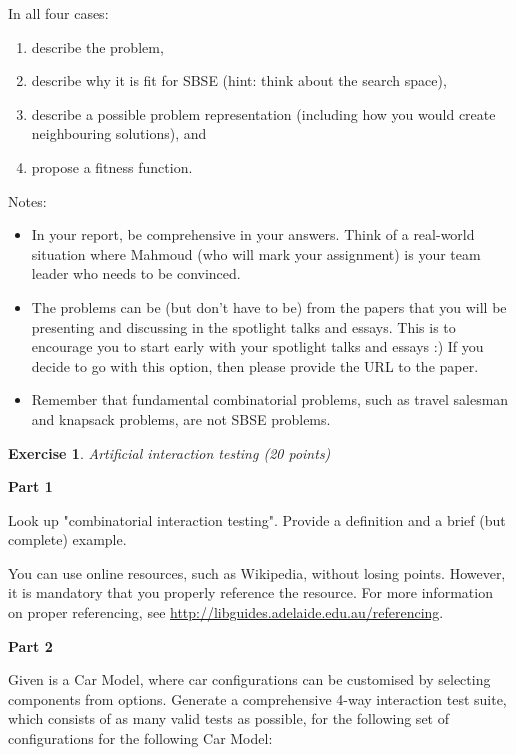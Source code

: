 \documentclass{pracs}
\newtheorem{exercise}{Exercise}
\begin{document}
In all four cases:
\begin{enumerate}
\item describe the problem, 
\item describe why it is fit for SBSE (hint: think about the search space), 
\item describe a possible problem representation (including how you would create neighbouring solutions), and 
\item propose a fitness function.
\end{enumerate}


Notes:
\begin{itemize}
\item In your report, be comprehensive in your answers. Think of a real-world situation where Mahmoud (who will mark your assignment) is your team leader who needs to be convinced.
\item The problems can be (but don't have to be) from the papers that you will be presenting and discussing in the spotlight talks and essays. This is to encourage you to start early with your spotlight talks and essays :) If you decide to go with this option, then please provide the URL to the paper.
\item Remember that fundamental combinatorial problems, such as travel salesman and knapsack problems, are not SBSE problems.  
\end{itemize}


\begin{exercise}
Artificial interaction testing  (20 points)
\end{exercise}

\textbf{Part 1}

Look up "combinatorial interaction testing". Provide a definition and a brief (but complete) example.

You can use online resources, such as Wikipedia, without losing points. However, it is mandatory that you properly reference the resource. For more information on proper referencing, see \url{http://libguides.adelaide.edu.au/referencing}. %

\textbf{Part 2}

Given is a Car Model, where car configurations can be customised by selecting components from options. Generate a comprehensive 4-way interaction test suite, which consists of as many valid tests as possible, for the following set of configurations for the following Car Model:
\end{document}
